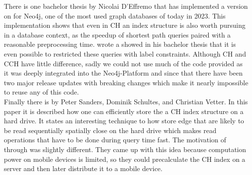 There is one bachelor thesis by Nicolai D'Effremo \cite[Some text]{DEffremo2019} that has implemented a version on \cite[Contraction Hierarchies]{Geisberger_2012} for Neo4j, one 
of the most used graph databases of today in 2023. This implementation shows that even in CH an index structure is also worth pursuing in a database context, as the speedup 
of shortest path queries paired with a reasonable preprocessing time. \cite{Zickenberg2021} wrote a showed in his bachelor thesis that it is even possible to restricted these
queries with label constraints. Although CH and CCH have little difference, sadly we could not use much of the code provided as it
was deeply integrated into the Neo4j-Platform and since that there have been two major release updates with breaking changes which make it nearly impossible to reuse any of
this code.\\

Finally there is \cite[Mobile Route Planning]{Sanders} by Peter Sanders, Dominik Schultes, and Christian Vetter. In this paper it is described how one can efficiently store
the a CH index structure on a hard drive. It states an interesting technique to how store edge that are likely to be read sequentially spatially close on the hard drive which 
makes read operations that have to be done during query time fast. The motivation of \cite[Mobile Route Planning]{Sanders} through was slightly different. They came up with this
idea because computation power on mobile devices is limited, so they could precalculate the CH index on a server and then later distribute it to a mobile device.
